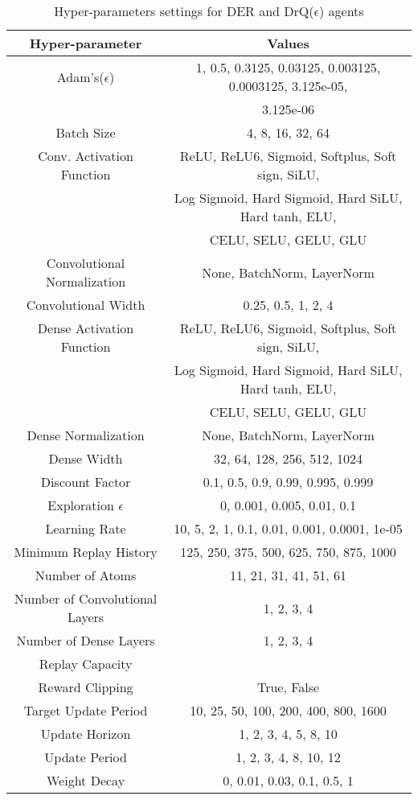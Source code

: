 \begin{table*}[!ht]
 \centering
  \caption{Hyper-parameters settings for DER and DrQ($\epsilon$) agents}
  \label{tbl:allvalues}
 \begin{tabular}{@{} cc @{}}
    \toprule
  Hyper-parameter &  Values \\
  \midrule
  Adam's($\epsilon$) & 1, 0.5, 0.3125, 0.03125, 0.003125, 0.0003125, 3.125e-05,\\
  & 3.125e-06 \\
  Batch Size & 4, 8, 16, 32, 64 \\
  Conv. Activation Function &  ReLU, ReLU6, Sigmoid, Softplus, Soft sign, SiLU, \\
  & Log Sigmoid, Hard Sigmoid, Hard SiLU, Hard tanh, ELU, \\
  & CELU, SELU, GELU, GLU \\
  Convolutional Normalization &  None, BatchNorm, LayerNorm \\
  Convolutional Width & 0.25, 0.5, 1, 2, 4 \\
  Dense Activation Function &  ReLU, ReLU6, Sigmoid, Softplus, Soft sign, SiLU, \\
  & Log Sigmoid, Hard Sigmoid, Hard SiLU, Hard tanh, ELU, \\
  & CELU, SELU, GELU, GLU \\
  Dense Normalization &  None, BatchNorm, LayerNorm \\
  Dense Width &  32, 64, 128, 256, 512, 1024 \\
  Discount Factor &  0.1, 0.5, 0.9, 0.99, 0.995, 0.999\\
  Exploration $\epsilon$ &  0, 0.001, 0.005, 0.01, 0.1\\
  Learning Rate & 10, 5, 2, 1, 0.1, 0.01, 0.001, 0.0001, 1e-05 \\
  Minimum Replay History & 125, 250, 375, 500, 625, 750, 875, 1000 \\
  Number of Atoms & 11, 21, 31, 41, 51, 61\\
  Number of Convolutional Layers &  1, 2, 3, 4\\
  Number of Dense Layers &  1, 2, 3, 4 \\
  Replay Capacity &  \\
  Reward Clipping &  True, False\\
  Target Update Period &  10, 25, 50, 100, 200, 400, 800, 1600\\
  Update Horizon & 1, 2, 3, 4, 5, 8, 10\\
  Update Period &  1, 2, 3, 4, 8, 10, 12\\
  Weight Decay &  0, 0.01, 0.03, 0.1, 0.5, 1\\

  \midrule
  \end{tabular}
\end{table*}

